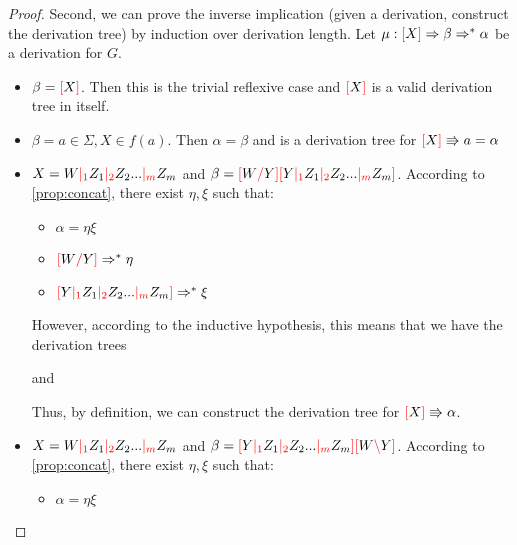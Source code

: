 \documentclass[main.tex]{subfiles}
\begin{document}
\begin{proof}
    Second, we can prove the inverse implication (given a derivation,
    construct the derivation tree) by induction over derivation
    length. Let $\mu: \textcolor{red}{[} X \textcolor{red}{]} \Rightarrow \beta \Rightarrow^* \alpha$
    be a derivation for $G$.
    \begin{itemize}
        \item $\beta = \textcolor{red}{[} X \textcolor{red}{]}$. Then this is the trivial reflexive case
            and $\textcolor{red}{[} X \textcolor{red}{]}$ is a valid derivation tree in itself.
        \item $\beta = a \in \Sigma, X \in f(a)$. Then $\alpha = \beta$ and
            is a derivation tree for $ \textcolor{red}{[} X \textcolor{red}{]} \Rrightarrow a = \alpha $
        \item $X = W \textcolor{red}{|_{1}} Z_1 \textcolor{red}{|_{2}} Z_2 ... \textcolor{red}{|_{m}} Z_m$ and
            $\beta = \textcolor{red}{[} W \textcolor{red}{/} Y \textcolor{red}{]} \textcolor{red}{[} Y \textcolor{red}{|_{1}} Z_1 \textcolor{red}{|_{2}} Z_2 ... \textcolor{red}{|_{m}} Z_m \textcolor{red}{]}$.
            According to \cref{prop:concat}, there exist $\eta, \xi$ such that:
            \begin{itemize}
                \item $\alpha = \eta \xi$
                \item $\textcolor{red}{[} W \textcolor{red}{/} Y \textcolor{red}{]} \Rightarrow^* \eta$
                \item $\textcolor{red}{[} Y \textcolor{red}{|_{1}} Z_1 \textcolor{red}{|_{2}} Z_2 ... \textcolor{red}{|_{m}} Z_m \textcolor{red}{]} \Rightarrow^* \xi$
            \end{itemize}
            However, according to the inductive hypothesis, this means that we
            have the derivation trees
            \begin{center}
                and
            \end{center}
            Thus, by definition, we can construct the derivation tree
            for $\textcolor{red}{[} X \textcolor{red}{]} \Rrightarrow \alpha$.
        \item $X = W \textcolor{red}{|_{1}} Z_1 \textcolor{red}{|_{2}} Z_2 ... \textcolor{red}{|_{m}} Z_m$ and
            $\beta = \textcolor{red}{[} Y \textcolor{red}{|_{1}} Z_1 \textcolor{red}{|_{2}} Z_2 ... \textcolor{red}{|_{m}} Z_m \textcolor{red}{]} \textcolor{red}{[} W \textcolor{red}{\backslash} Y \textcolor{red}{]}$.
            According to \cref{prop:concat}, there exist $\eta, \xi$ such that:
            \begin{itemize}
                \item $\alpha = \eta \xi$

\end{itemize}
\end{itemize}
\end{proof}
\end{document}
